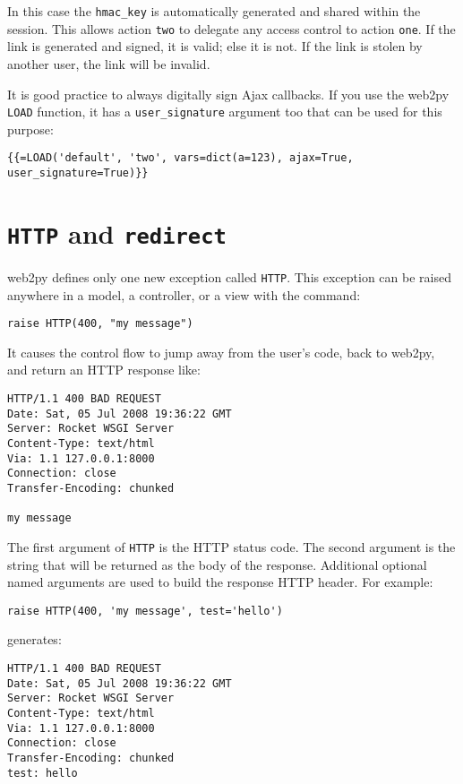 \documentclass[justified,sixbynine,notoc]{tufte-book}
\def\ft{\small\tt}
\def\inxx#1{\index{#1}}
\begin{document}
\begin{fullwidth}
In this case the {\ft hmac\_key} is automatically generated and shared within the session. This allows action {\ft two} to delegate any access control to action {\ft one}. If the link is generated and signed, it is valid; else it is not. If the link is stolen by another user, the link will be invalid.

It is good practice to always digitally sign Ajax callbacks. If you use the web2py {\ft LOAD} function, it has a {\ft user\_signature} argument too that can be used for this purpose:

\begin{lstlisting}[keywords={}]
{{=LOAD('default', 'two', vars=dict(a=123), ajax=True, user_signature=True)}}
\end{lstlisting}

\goodbreak\section{{\ft HTTP} and {\ft redirect}}

\inxx{HTTP} \inxx{redirect}
\noindent web2py defines only one new exception called {\ft HTTP}. This exception can be raised anywhere in a model, a controller, or a view with the command:

\begin{lstlisting}
raise HTTP(400, "my message")
\end{lstlisting}

It causes the control flow to jump away from the user's code, back to web2py, and return an HTTP response like:
\begin{lstlisting}
HTTP/1.1 400 BAD REQUEST
Date: Sat, 05 Jul 2008 19:36:22 GMT
Server: Rocket WSGI Server
Content-Type: text/html
Via: 1.1 127.0.0.1:8000
Connection: close
Transfer-Encoding: chunked

my message
\end{lstlisting}

The first argument of {\ft HTTP} is the HTTP status code. The second argument is the string that will be returned as the body of the response. Additional optional named arguments are used to build the response HTTP header.
For example:
\begin{lstlisting}
raise HTTP(400, 'my message', test='hello')
\end{lstlisting}
\noindent generates:
\begin{lstlisting}
HTTP/1.1 400 BAD REQUEST
Date: Sat, 05 Jul 2008 19:36:22 GMT
Server: Rocket WSGI Server
Content-Type: text/html
Via: 1.1 127.0.0.1:8000
Connection: close
Transfer-Encoding: chunked
test: hello


\end{lstlisting}
\end{fullwidth}
\end{document}
